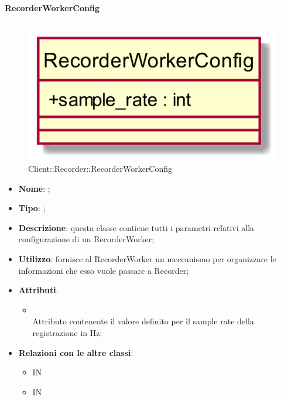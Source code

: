 \hypertarget{RecorderWorkerConfig_label}{\paragraph{RecorderWorkerConfig}}
\begin{figure}[h]
	\centering
	\includegraphics[width=\textwidth,height=\textheight,keepaspectratio]{images/ClassRecorderWorkerConfig.png}
	\caption{Client::Recorder::RecorderWorkerConfig}
\end{figure}
\begin{itemize}
	\item \textbf{Nome}: ;
	\item \textbf{Tipo}: ;
	\item \textbf{Descrizione}: questa classe contiene tutti i parametri relativi alla configurazione di un RecorderWorker;
	\item \textbf{Utilizzo}: fornisce al RecorderWorker un meccanismo per organizzare le informazioni che esso vuole passare a Recorder;
	\item \textbf{Attributi}:
	\begin{itemize}
		\item[]  \\
		Attributo contenente il valore definito per il sample rate della registrazione in Hz;
	\end{itemize}
	\item \textbf{Relazioni con le altre classi}:
	\begin{itemize}
		\item IN \hyperlink{RecorderWorker_label}{}
		\item IN \hyperlink{RecorderWorkerMsg_label}{}
	\end{itemize}
\end{itemize}

